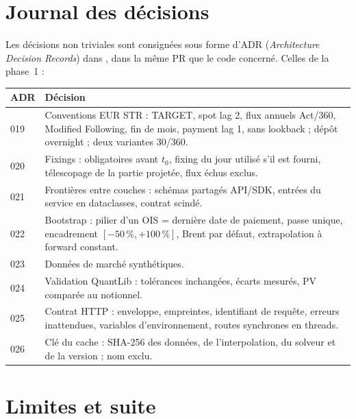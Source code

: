 \documentclass[11pt,a4paper]{article}
\newcommand{\estr}{\texorpdfstring{\texteuro STR}{EUR STR}}
\newcommand{\code}[1]{\texttt{\detokenize{#1}}}
\theoremstyle{plain}
\theoremstyle{definition}
\theoremstyle{remark}
\begin{document}
\section{Journal des décisions}

Les décisions non triviales sont consignées sous forme d'ADR (\emph{Architecture Decision Records}) dans
\code{docs/DECISIONS.md}, dans la même PR que le code concerné. Celles de la phase~1 :

\begin{center}
\small
\begin{tabularx}{\linewidth}{@{}l>{\raggedright\arraybackslash}X@{}}
\toprule
ADR & Décision\\
\midrule
019 & Conventions EUR \estr{} : TARGET, spot lag 2, flux annuels Act/360, Modified Following, fin de
      mois, payment lag 1, sans lookback ; dépôt overnight ; deux variantes 30/360.\\
020 & Fixings : obligatoires avant $t_0$, fixing du jour utilisé s'il est fourni, télescopage de la
      partie projetée, flux échus exclus.\\
021 & Frontières entre couches : schémas partagés API/SDK, entrées du service en dataclasses, contrat
      \code{ui} scindé.\\
022 & Bootstrap : pilier d'un OIS = dernière date de paiement, passe unique, encadrement
      $[-50\,\%,+100\,\%]$, Brent par défaut, extrapolation à forward constant.\\
023 & Données de marché synthétiques.\\
024 & Validation QuantLib : tolérances inchangées, écarts mesurés, PV comparée au notionnel.\\
025 & Contrat HTTP : enveloppe, empreintes, identifiant de requête, erreurs inattendues, variables
      d'environnement, routes synchrones en threads.\\
026 & Clé du cache : SHA-256 des données, de l'interpolation, du solveur et de la version ; nom exclu.\\
\bottomrule
\end{tabularx}
\end{center}

\section{Limites et suite}\label{sec:limites}
\end{document}
